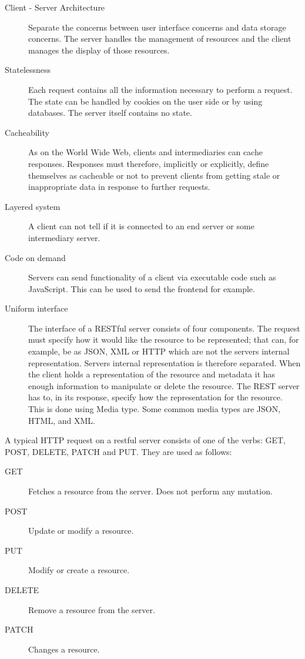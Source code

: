 \begin{description}
\item[ Client - Server Architecture ] Separate the concerns between user
interface concerns and data storage concerns. The server handles the management
of resources and the client manages the display of those resources.
\item[Statelessness] Each request contains all the information necessary to
perform a request. The state can be handled by cookies on the user side or by using
databases. The server itself contains no state.
\item[Cacheability] As on the World Wide Web, clients and intermediaries can
cache responses. Responses must therefore, implicitly or explicitly, define
themselves as cacheable or not to prevent clients from getting stale or
inappropriate data in response to further requests. 
\item[Layered system] A client can not tell if it is connected to an end server
or some intermediary server. 
\item[Code on demand] Servers can send functionality of a client via executable
code such as JavaScript. This can be used to send the frontend for example.
\item[Uniform interface] The interface of a RESTful server consists of four
components. The request must specify how it would like the resource to be
represented; that can, for example, be as JSON, XML or HTTP which are not the
servers internal representation. Servers internal representation is therefore
separated. When the client holds a representation of the resource and metadata
it has enough information to manipulate or delete the resource. The REST
server has to, in its response, specify how the representation for the
resource. This is done using Media type. Some common media types are JSON, HTML,
and XML.
\end{description}

A typical HTTP request on a restful server consists of one of the  verbs: GET,
POST, DELETE, PATCH and PUT. They are used as follows:

\begin{description}
\item[GET] Fetches a resource from the server. Does not perform any mutation. 
\item[POST] Update or modify a resource.
\item[PUT] Modify or create a resource.
\item[DELETE] Remove a resource from the server.
\item[PATCH] Changes a resource.
\end{description}

